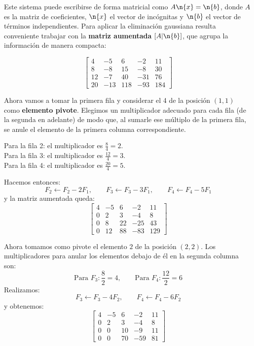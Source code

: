Este sistema puede escribirse de forma matricial como \(A\n{x} = \n{b}\), donde \(A\) es la matriz de coeficientes, \(\n{x}\) el vector de incógnitas y \(\n{b}\) el vector de términos independientes. Para aplicar la eliminación gaussiana resulta conveniente trabajar con la \textbf{matriz aumentada} \([A|\n{b}]\), que agrupa la información de manera compacta:

\[
\left[\begin{array}{cccc|c}
4 & -5 & 6 & -2 & 11 \\
8 & -8 & 15 & -8 & 30 \\
12 & -7 & 40 & -31 & 76 \\
20 & -13 & 118 & -93 & 184
\end{array}\right]
\]


Ahora vamos a tomar la primera fila y considerar el 4 de la posición \((1,1)\) como \textbf{elemento pivote}. Elegimos un multiplicador adecuado para cada fila (de la segunda en adelante) de modo que, al sumarle ese múltiplo de la primera fila, se anule el elemento de la primera columna correspondiente.

Para la fila 2: el multiplicador es \(\frac{8}{4} = 2\). \\
Para la fila 3: el multiplicador es \(\frac{12}{4} = 3\). \\
Para la fila 4: el multiplicador es \(\frac{20}{4} = 5\).

Hacemos entonces:
\[
F_2 \leftarrow F_2 - 2F_1,\qquad
F_3 \leftarrow F_3 - 3F_1,\qquad
F_4 \leftarrow F_4 - 5F_1
\]
y la matriz aumentada queda:
\[
\left[\begin{array}{cccc|c}
4 & -5 & 6 & -2 & 11 \\
0 &  2 & 3 & -4 &  8 \\
0 &  8 & 22 & -25 & 43 \\
0 & 12 & 88 & -83 & 129
\end{array}\right]
\]

Ahora tomamos como pivote el elemento \(2\) de la posición \((2,2)\). Los multiplicadores para anular los elementos debajo de él en la segunda columna son:
\[
\text{Para } F_3 : \frac{8}{2} = 4,\qquad
\text{Para } F_4 : \frac{12}{2} = 6
\]
Realizamos:
\[
F_3 \leftarrow F_3 - 4F_2,\qquad
F_4 \leftarrow F_4 - 6F_2
\]
y obtenemos:
\[
\left[\begin{array}{cccc|c}
4 & -5 &  6 & -2 & 11 \\
0 &  2 &  3 & -4 &  8 \\
0 &  0 & 10 & -9 & 11 \\
0 &  0 & 70 & -59 & 81
\end{array}\right]
\]

